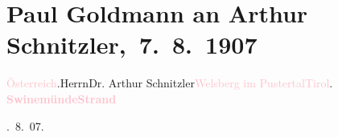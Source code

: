 

\renewcommand{\erwaehntePersonen}{Personen:  Nikolaus II. von Russland, Olga Schnitzler,  Wilhelm II. von Preußen}
\renewcommand{\erwaehnteOrte}{Orte: Tirol, Warszòw plaża, Welsberg-Taisten, Österreich-Ungarn, Świnoujście}
\renewcommand{\erwaehnteWerke}{Werke: [Bericht über das Treffen von Kaiser Wilhelm II. und Zar Nikolaus II. in Swinemünde, August 1907]}
\section[ Paul Goldmann an Arthur Schnitzler, 7. 8. 1907]{Paul Goldmann an Arthur Schnitzler, 7. 8. 1907}
\nopagebreak{}
\rehead{ }\normalsize\beginnumbering{}
\toendnotes[C]{\smallbreak\pagebreak[2]}
\toendnotes[C]{\smallbreak}\pstart{}{\pb}\textcolor{pink}{Österreich}{}\ledrightnote{\textcolor{pink}{Österreich-Ungarn}}.\pend{}\pstart{}Herrn\pend{}\pstart{}Dr. Arthur Schnitzler\pend{}\pstart{}\textcolor{pink}{Welsberg im Pustertal}{}\ledrightnote{\textcolor{pink}{Welsberg-Taisten}}\pend{}\pstart{}\textcolor{pink}{Tirol}{}\ledrightnote{\textcolor{pink}{Tirol}}.\pend{}
{\bigskip}
\pstart
           \noindent{}{\pb}\textcolor{gray}{\textbf{\textbf{\textcolor{pink}{Swinemünde}{}\ledrightnote{\textcolor{pink}{Świnoujście}}}}}\hfill \textcolor{gray}{\textbf{\textbf{\textcolor{pink}{Strand}{}\ledrightnote{\textcolor{pink}{Warszòw plaża}}}}}\pend
           
. 8. 07.\pend
           
